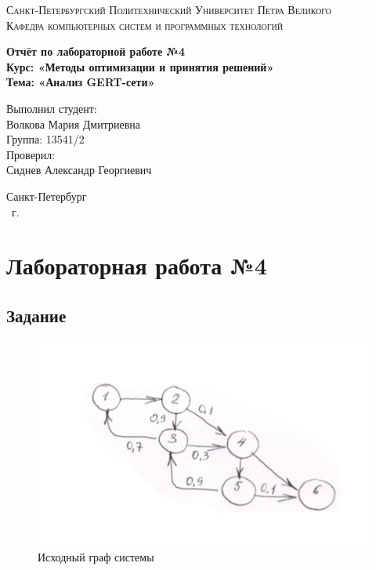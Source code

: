 \documentclass[14pt,a4paper,report]{report}
\begin{document}
\def\contentsname{Содержание}

\begin{titlepage}
	\begin{center}
		\textsc{Санкт-Петербургский Политехнический 
			Университет Петра Великого\\[5mm]
			Кафедра компьютерных систем и программных технологий}
		
		\vfill
		
		\textbf{Отчёт по лабораторной работе №4\\[3mm]
			Курс: «Методы оптимизации и принятия решений»\\[3mm]
			Тема: «Анализ GERT-сети»\\[35mm]
			}
	\end{center}
	
	\hfill
	\begin{minipage}{.5\textwidth}
		Выполнил студент:\\[2mm] 
		Волкова Мария Дмитриевна\\
		Группа: 13541/2\\[5mm]
		
		Проверил:\\[2mm] 
		Сиднев Александр Георгиевич
	\end{minipage}
	\vfill
	\begin{center}
		Санкт-Петербург\\ \the\year\ г.
	\end{center}
\end{titlepage}

\tableofcontents
\clearpage

\chapter{Лабораторная работа №4}

\section{Задание}

\begin{figure}[h!]
	\centering
	\includegraphics[scale = 0.55]{images/00.png}
	\caption{Исходный граф системы}
	\label{image:0}
\end{figure}
\end{document}
